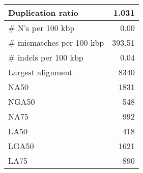 \documentclass[12pt,a4paper]{article}
\begin{document}
\begin{table}[ht]
\begin{center}
\begin{tabular}{|l*{1}{|r}|}
Duplication ratio & 1.031 \\ \hline
\# N's per 100 kbp & 0.00 \\ \hline
\# mismatches per 100 kbp & 393.51 \\ \hline
\# indels per 100 kbp & 0.04 \\ \hline
Largest alignment & 8340 \\ \hline
NA50 & 1831 \\ \hline
NGA50 & 548 \\ \hline
NA75 & 992 \\ \hline
LA50 & 418 \\ \hline
LGA50 & 1621 \\ \hline
LA75 & 890 \\ \hline
\end{tabular}
\end{center}
\end{table}
\end{document}
